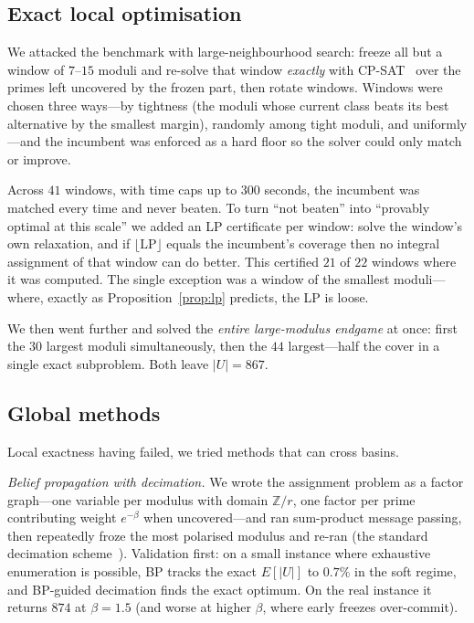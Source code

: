 \subsection{Exact local optimisation}

We attacked the benchmark with large-neighbourhood search: freeze all but a
window of $7$--$15$ moduli and re-solve that window \emph{exactly} with
CP-SAT~\cite{CPSAT} over the primes left uncovered by the frozen part, then
rotate windows. Windows were chosen three ways---by tightness (the moduli whose
current class beats its best alternative by the smallest margin), randomly among
tight moduli, and uniformly---and the incumbent was enforced as a hard floor so
the solver could only match or improve.

Across $41$ windows, with time caps up to $300$ seconds, the incumbent was
matched every time and never beaten. To turn ``not beaten'' into ``provably
optimal at this scale'' we added an LP certificate per window: solve the
window's own relaxation, and if $\lfloor\mathrm{LP}\rfloor$ equals the
incumbent's coverage then no integral assignment of that window can do better.
This certified $21$ of $22$ windows where it was computed. The single exception
was a window of the smallest moduli---where, exactly as
Proposition~\ref{prop:lp} predicts, the LP is loose.

We then went further and solved the \emph{entire large-modulus endgame} at once:
first the $30$ largest moduli simultaneously, then the $44$ largest---half the
cover in a single exact subproblem. Both leave $|U|=867$.

\subsection{Global methods}

Local exactness having failed, we tried methods that can cross basins.

\emph{Belief propagation with decimation.} We wrote the assignment problem as a
factor graph---one variable per modulus with domain $\mathbb{Z}/r$, one factor
per prime contributing weight $e^{-\beta}$ when uncovered---and ran sum-product
message passing, then repeatedly froze the most polarised modulus and re-ran
(the standard decimation scheme~\cite{MezardMontanari}). Validation first: on a
small instance where exhaustive enumeration is possible, BP tracks the exact
$E[|U|]$ to $0.7\%$ in the soft regime, and BP-guided decimation finds the exact
optimum. On the real instance it returns $874$ at $\beta=1.5$ (and worse at
higher $\beta$, where early freezes over-commit).

